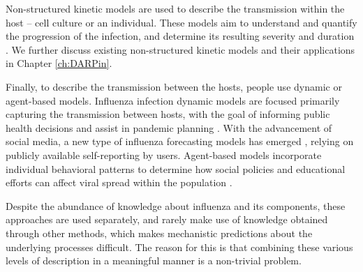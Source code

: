 Non-structured kinetic models are used to describe the transmission within the host – cell culture or an individual. These models aim to understand and quantify the progression of the infection, and determine its resulting severity and duration \cite{beauchemin2008modeling}. We further discuss existing non-structured kinetic models and their applications in Chapter \ref{ch:DARPin}.

Finally, to describe the transmission between the hosts, people use dynamic or agent-based models. Influenza infection dynamic models are focused primarily capturing the transmission between hosts, with the goal of informing public health decisions and assist in pandemic planning \cite{ferguson2006strategies, mcvernon2007model}. With the advancement of social media, a new type of influenza forecasting models has emerged \cite{pawelek2014modeling, santillana2015combining, levy2018modeling}, relying on publicly available self-reporting by users. Agent-based models incorporate individual behavioral patterns to determine how social policies and educational efforts can affect viral spread within the population \cite{karimi2015effect}.

Despite the abundance of knowledge about influenza and its components, these approaches are used separately, and rarely make use of knowledge obtained through other methods, which makes mechanistic predictions about the underlying processes difficult. The reason for this is that combining these various levels of description in a meaningful manner is a non-trivial problem.
